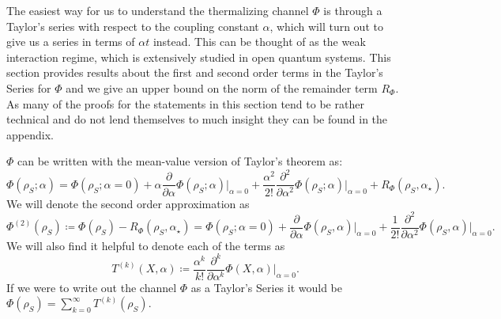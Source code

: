 \documentclass{article}
\begin{document}
The easiest way for us to understand the thermalizing channel $\Phi$ is through a Taylor's series with respect to the coupling constant $\alpha$, which will turn out to give us a series in terms of $\alpha t$ instead. This can be thought of as the weak interaction regime, which is extensively studied in open quantum systems. This section provides results about the first and second order terms in the Taylor's Series for $\Phi$ and we give an upper bound on the norm of the remainder term $R_{\Phi}$. As many of the proofs for the statements in this section tend to be rather technical and do not lend themselves to much insight they can be found in the appendix. 

$\Phi$ can be written with the mean-value version of Taylor's theorem as:
\begin{equation}
    \Phi(\rho_S; \alpha) = \Phi(\rho_S; \alpha = 0) + \alpha \frac{\partial}{\partial \alpha} \Phi(\rho_S; \alpha) \bigg|_{\alpha = 0} + \frac{\alpha^2}{2!} \frac{\partial^2}{\partial \alpha^2} \Phi(\rho_S; \alpha) \bigg|_{\alpha = 0} + R_{\Phi}(\rho_S, \alpha_{\star}).
\end{equation}
We will denote the second order approximation as
\begin{equation}
    \Phi^{(2)}(\rho_S) \coloneqq \Phi(\rho_S) - R_{\Phi}(\rho_S, \alpha_\star) = \Phi(\rho_S;\alpha= 0) + \frac{\partial}{\partial \alpha} \Phi(\rho_S, \alpha) \bigg|_{\alpha = 0} + \frac{1}{2!} \frac{\partial^2}{\partial \alpha^2} \Phi(\rho_S, \alpha) \bigg|_{\alpha = 0}. \label{def:second_order_approx}
\end{equation}
We will also find it helpful to denote each of the terms as
\begin{equation}
    T^{(k)}(X, \alpha) \coloneqq \frac{\alpha^k}{k!} \frac{\partial^k}{\partial \alpha^k} \Phi(X, \alpha)\bigg|_{\alpha = 0}.\label{def:taylor_series_terms}
\end{equation}
If we were to write out the channel $\Phi$ as a Taylor's Series it would be $\Phi(\rho_S) = \sum_{k = 0}^{\infty} T^{(k)}(\rho_S)$.
\end{document}
